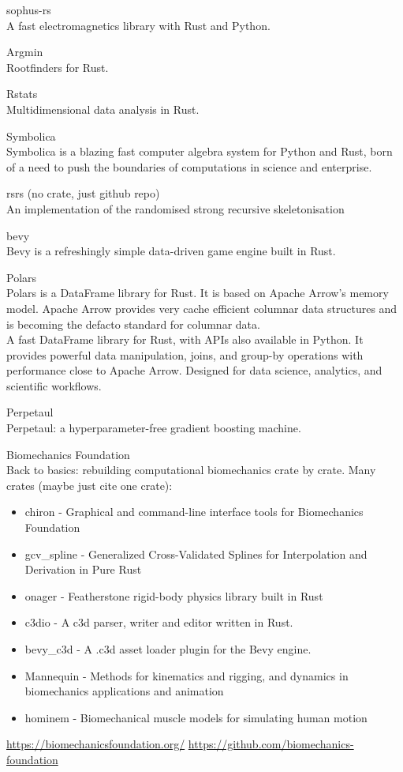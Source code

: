 \documentclass{article}
\begin{document}
sophus-rs\\
A fast electromagnetics library with Rust and Python.

Argmin\\
Rootfinders for Rust.

Rstats\\
Multidimensional data analysis in Rust.

Symbolica\\
Symbolica is a blazing fast computer algebra system for Python and Rust, born of a need
to push the boundaries of computations in science and enterprise.

rsrs (no crate, just github repo)\\
An implementation of the randomised strong recursive
skeletonisation

bevy\\
Bevy is a refreshingly simple data-driven game engine built in Rust.

Polars\\
Polars is a DataFrame library for Rust. It is based on Apache Arrow’s memory model. Apache
Arrow provides very cache efficient columnar data structures and is becoming the defacto standard
for columnar data.\\
A fast DataFrame library for Rust, with APIs also available in Python. It
provides powerful data manipulation, joins, and group-by operations with performance close to
Apache Arrow. Designed for data science, analytics, and scientific workflows.

Perpetaul\\
Perpetaul: a hyperparameter-free gradient boosting machine.

Biomechanics Foundation\\
Back to basics: rebuilding computational biomechanics crate by crate.
Many crates (maybe just cite one crate):
\begin{itemize}
    \item chiron - Graphical and command-line interface tools for Biomechanics Foundation
    \item gcv\_spline - Generalized Cross-Validated Splines for Interpolation and Derivation in Pure Rust
    \item onager - Featherstone rigid-body physics library built in Rust
    \item c3dio - A c3d parser, writer and editor written in Rust.
    \item bevy\_c3d - A .c3d asset loader plugin for the Bevy engine.
    \item Mannequin - Methods for kinematics and rigging, and dynamics in biomechanics applications and
          animation
    \item hominem - Biomechanical muscle models for simulating human motion
\end{itemize}
\url{https://biomechanicsfoundation.org/}
\url{https://github.com/biomechanics-foundation}
\end{document}

